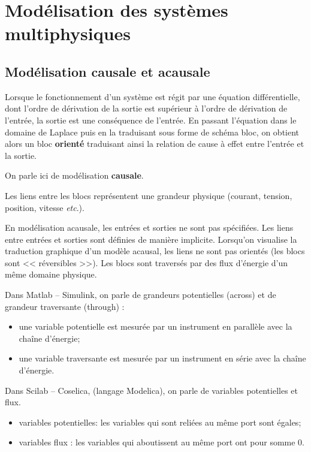 
\section{Modélisation des systèmes multiphysiques}
\subsection{Modélisation causale et acausale}

Lorsque le fonctionnement d'un système est régit par une équation différentielle, dont l'ordre de dérivation de la sortie est supérieur à l'ordre de dérivation de l'entrée, la sortie est une conséquence de l'entrée. En passant l'équation dans le domaine de Laplace puis en la traduisant sous forme de schéma bloc, on obtient alors un bloc \textbf{orienté} traduisant ainsi la relation de cause à effet entre l'entrée et la sortie. 

On parle ici de modélisation \textbf{causale}. 

Les liens entre les blocs représentent une grandeur physique (courant, tension, position, vitesse \textit{etc}.).


En modélisation acausale, les entrées et sorties ne sont pas spécifiées. Les liens entre entrées et sorties sont définies de manière implicite. Lorsqu'on visualise la traduction graphique d'un modèle acausal, les liens ne sont pas orientés (les blocs sont << réversibles >>). Les blocs sont traversés par des flux d'énergie d'un même domaine physique.  

Dans Matlab -- Simulink, on parle de grandeurs potentielles (across) et de grandeur traversante (through) : 
\begin{itemize}
\item une variable potentielle est mesurée par un instrument
en parallèle avec la chaîne d’énergie;
\item une variable traversante est mesurée par un instrument
en série avec la chaîne d’énergie.
\end{itemize}

Dans Scilab -- Coselica, (langage Modelica), on parle de variables potentielles et flux.
\begin{itemize}
\item variables potentielles: les variables qui sont reliées au même port sont égales;
\item variables flux : les variables qui aboutissent au
même port ont pour somme 0.
\end{itemize}


